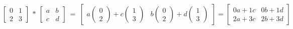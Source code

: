 \documentclass[12 pt]{slides}
\begin{document}
\begingroup
\[\begin{bmatrix}0 & 1\\2 & 3\end{bmatrix}\ *\ \begin{bmatrix}a & b\\c & d\end{bmatrix}\ =
\ \begin{bmatrix}a\begin{pmatrix}0\\2\end{pmatrix} + c\begin{pmatrix}1\\3\end{pmatrix} &
                 b\begin{pmatrix}0\\2\end{pmatrix} + d\begin{pmatrix}1\\3\end{pmatrix}\end{bmatrix} 
= \begin{bmatrix}0a + 1c & 0b + 1d\\2a + 3c & 2b + 3d\end{bmatrix}\]
\endgroup
\end{document}
